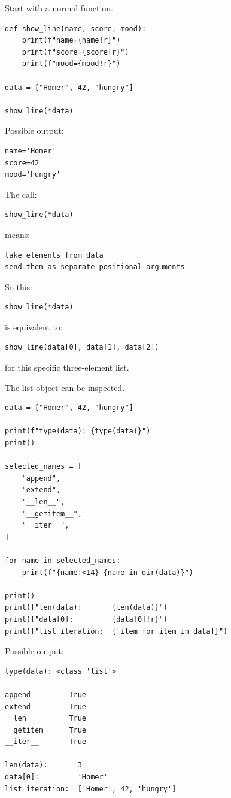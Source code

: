 Start with a normal function.

\begin{verbatim}
def show_line(name, score, mood):
    print(f"name={name!r}")
    print(f"score={score!r}")
    print(f"mood={mood!r}")

data = ["Homer", 42, "hungry"]

show_line(*data)
\end{verbatim}

Possible output:

\begin{verbatim}
name='Homer'
score=42
mood='hungry'
\end{verbatim}

The call:

\begin{verbatim}
show_line(*data)
\end{verbatim}

means:

\begin{verbatim}
take elements from data
send them as separate positional arguments
\end{verbatim}

So this:

\begin{verbatim}
show_line(*data)
\end{verbatim}

is equivalent to:

\begin{verbatim}
show_line(data[0], data[1], data[2])
\end{verbatim}

for this specific three-element list.

The list object can be inspected.

\begin{verbatim}
data = ["Homer", 42, "hungry"]

print(f"type(data): {type(data)}")
print()

selected_names = [
    "append",
    "extend",
    "__len__",
    "__getitem__",
    "__iter__",
]

for name in selected_names:
    print(f"{name:<14} {name in dir(data)}")

print()
print(f"len(data):       {len(data)}")
print(f"data[0]:         {data[0]!r}")
print(f"list iteration:  {[item for item in data]}")
\end{verbatim}

Possible output:

\begin{verbatim}
type(data): <class 'list'>

append         True
extend         True
__len__        True
__getitem__    True
__iter__       True

len(data):       3
data[0]:         'Homer'
list iteration:  ['Homer', 42, 'hungry']
\end{verbatim}

